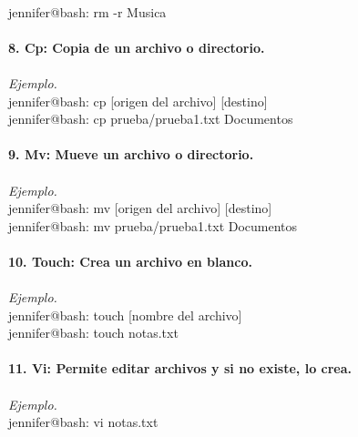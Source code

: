 \documentclass{article}
\begin{document}
\\jennifer@bash: rm -r  Musica
\\ \\
\textbf{8. Cp: Copia de un archivo o directorio.}
\\\\\textit{Ejemplo.}
\\jennifer@bash: cp [origen del archivo] [destino]
\\jennifer@bash: cp prueba/prueba1.txt Documentos
\\ \\
\textbf{9. Mv: Mueve un archivo o directorio.}
\\\\\textit{Ejemplo.}
\\jennifer@bash: mv [origen del archivo] [destino]
\\jennifer@bash: mv prueba/prueba1.txt Documentos
\\ \\
\textbf{10.  Touch: Crea un archivo en blanco.}
\\\\\textit{Ejemplo.}
\\jennifer@bash: touch [nombre del archivo]
\\jennifer@bash: touch notas.txt
\\ \\
\textbf{11. Vi: Permite editar archivos y si no existe, lo crea.}
\\\\\textit{Ejemplo.}
\\jennifer@bash: vi notas.txt\\
\end{document}
